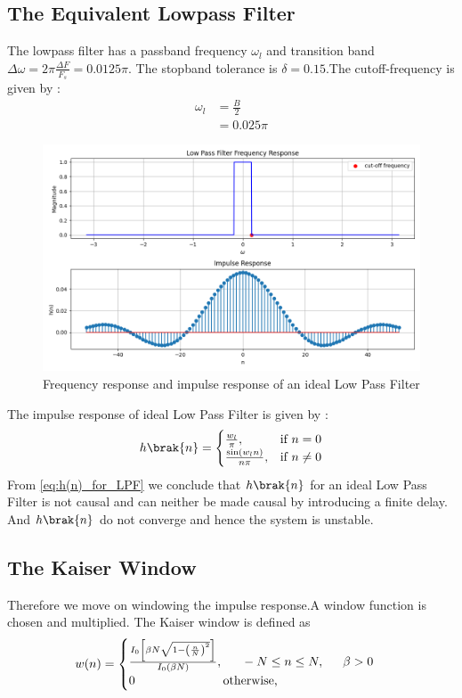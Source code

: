 \documentclass{article}
\begin{document}
\subsection{The Equivalent Lowpass Filter}
The lowpass filter has a passband frequency $\omega_l$ and transition band $\Delta \omega = 2\pi \frac{\Delta F}{F_s} = 0.0125\pi$.
The stopband tolerance is $\delta=0.15$.The cutoff-frequency is given by :
\begin{align}
    \omega_{l} &= \frac{B}{2}\\
                &= 0.025\pi
\end{align}
\begin{figure}[H]
\centering
\includegraphics[width=1\columnwidth]{figs/Impulse.png}
\caption{Frequency response and impulse response of an ideal Low Pass Filter}
\label{fig:LPF_FIR_1}
\end{figure}

The impulse response of ideal Low Pass Filter is given by :
\begin{align}
    h\brak{n} = 
\begin{cases} 
    \frac{w_l}{\pi}, & \text{if } n = 0 \\
    \frac{\sin(w_l n)}{n\pi}, & \text{if } n \neq 0
\end{cases} \label{eq:h(n)_for_LPF}
\end{align}
From \eqref{eq:h(n)_for_LPF} we conclude that $h\brak{n}$ for an ideal Low Pass Filter is not causal and can neither be made causal by introducing a finite delay. And $h\brak{n}$ do not converge and hence the system is unstable.
\subsection{The Kaiser Window}
Therefore we move on windowing the impulse response.A window function is chosen and multiplied. The Kaiser window is defined as
\begin{align}
    w(n) =
    \begin{cases}
    \frac{I_0\left[ \beta N \sqrt{1 - \left(\frac{n}{N}\right)^2} \right]}{I_0(\beta N)},
\indent -N \leq n \leq N, \indent \beta > 0 \nonumber \\
 0 \hspace{2.5 cm} \mbox{otherwise,}
 \end{cases}
\end{align}
\end{document}
